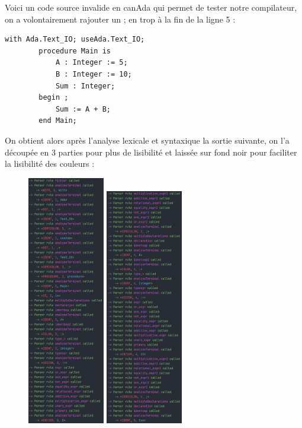 \documentclass[french,a4paper]{article}
\begin{document}
    Voici un code source invalide en canAda qui permet de tester notre compilateur, on a volontairement rajouter un ; en trop à la fin de la ligne 5 :

    \begin{lstlisting}[label={lst:lstlisting17}]
        with Ada.Text_IO; useAda.Text_IO;
        procedure Main is
            A : Integer := 5;
            B : Integer := 10;
            Sum : Integer;
        begin ;
            Sum := A + B;
        end Main;
    \end{lstlisting}

    On obtient alors après l'analyse lexicale et syntaxique la sortie suivante, on l'a découpée en 3 parties pour plus de lisibilité et laissée sur fond noir pour faciliter la lisibilité des couleurs :

    \begin{figure}[H]
        \centering
        \includegraphics[width=0.3\textwidth]{sortie1_err}
        \hfill
        \includegraphics[width=0.3\textwidth]{sortie2_err}

\end{figure}
\end{document}
